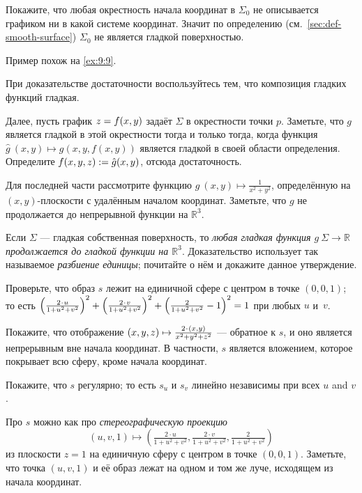 \begin{multicols}{2}
Покажите, что любая окрестность начала координат в $\Sigma_0$ не описывается графиком ни в какой системе координат.
Значит по определению (см.~\ref{sec:def-smooth-surface}) $\Sigma_0$ не является гладкой поверхностью.

Пример похож на \ref{ex:9:9}.

При доказательстве достаточности воспользуйтесь тем, что композиция гладких функций гладкая.

Далее, пусть график $z\z=f(x,y)$ задаёт $\Sigma$ в окрестности точки $p$.
Заметьте, что $g$ является гладкой в этой окрестности тогда и только тогда, когда функция $\hat g\:(x,y)\mapsto g(x,y,f(x,y))$ является гладкой в своей области определения.
Определите $f(x,y,z)\z\df \hat g(x,y)$, отсюда достаточность.

Для последней части рассмотрите функцию $g\:(x,y)\mapsto\tfrac1{x^2+y^2}$, определённую на $(x,y)$-плоскости с удалённым началом координат.
Заметьте, что $g$ не продолжается до непрерывной функции на $\mathbb{R}^3$.

Если $\Sigma$ --- гладкая собственная поверхность,
то \textit{любая гладкая функция $g\:\Sigma\to\mathbb{R}$ продолжается до гладкой функции на $\mathbb{R}^3$}.
Доказательство использует так называемое \emph{разбиение единицы};
почитайте о нём и докажите данное утверждение.

Проверьте, что образ $s$ лежит на единичной сфере с центром в точке $(0,0,1)$;
то есть $
\left(\tfrac{2\cdot u}{1+u^2+v^2}\right)^2
\z+
\left(\tfrac{2\cdot v}{1+u^2+v^2}\right)^2
\z+
\left(\tfrac{2}{1+u^2+v^2}-1\right)^2\z=1$
при любых $u$ и~$v$.

Покажите, что отображение 
$(x,y,z)\z\mapsto \tfrac{2\cdot(x,y)}{x^2+y^2+z^2}$
--- обратное к $s$, и оно является непрерывным вне начала координат.
В частности, $s$ является вложением, которое покрывает всю сферу, кроме начала координат.

Покажите, что $s$ регулярно; то есть $s_u$ и $s_v$ линейно независимы при всех $u$ and $v$.

Про $s$ можно как про \emph{стереографическую проекцию}
\[(u,v,1)\mapsto (\tfrac{2\cdot u}{1+u^2+v^2},\tfrac{2\cdot v}{1+u^2+v^2},\tfrac{2}{1+u^2+v^2})\]
из плоскости $z=1$ на единичную сферу с центром в точке $(0,0,1)$.
Заметьте, что точка $(u,v,1)$ и её образ лежат на одном и том же луче, исходящем из начала координат.


\end{multicols}
